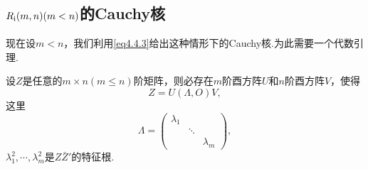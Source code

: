 \subsection{$R_{\text{\uppercase\expandafter{\romannumeral1}}}(m,n)(m<n)$的Cauchy核}
现在设$m<n$，我们利用\eqref{eq4.4.3}给出这种情形下的Cauchy核.为此需要一个代数引理.
\begin{lemma}\label{lem4.4.1}
	设$Z$是任意的$m\times n(m\le n)$阶矩阵，则必存在$m$阶酉方阵$U$和$n$阶酉方阵$V$，使得
	\[Z=U(\Lambda,O)V,\]
	这里
	\[\Lambda=\begin{pmatrix}
		\lambda_1 & &\\
		&\ddots&\\
		&&\lambda_m
	\end{pmatrix},\]
$\lambda_1^2,\cdots,\lambda_m^2$是$Z\bar{Z}'$的特征根.
\end{lemma}
